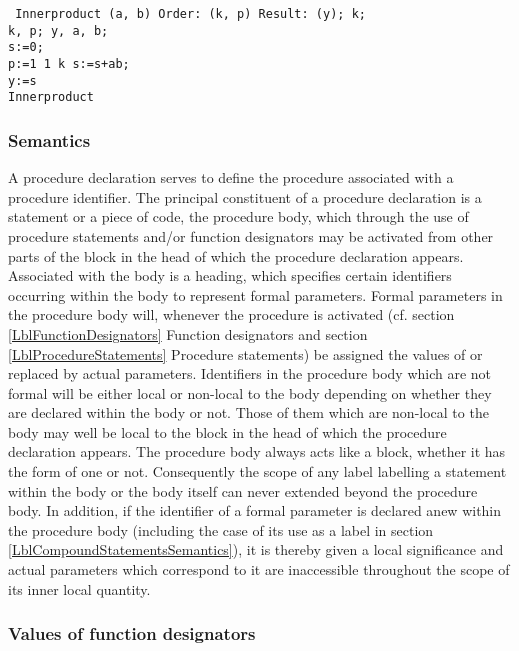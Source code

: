 \documentclass[a4paper,11pt]{article}
\begin{document}
\begin{flushleft}
\texttt{ Innerproduct (a, b) Order: (k, p) Result: (y);  k;\\
 k, p;  y, a, b;\\
s:=0;\\
 p:=1  1  k  s:=s+a\mtim{}b;\\
y:=s\\
 Innerproduct
}\end{flushleft}


\subsubsection{Semantics}
\label{LblProcedureDeclarationsSemantics}

A procedure declaration serves to define the procedure associated with
a procedure identifier.  The principal constituent of a procedure
declaration is a statement or a piece of code, the procedure body,
which through the use of procedure statements and/or function
designators may be activated from other parts of the block in the head
of which the procedure declaration appears.  Associated with the body
is a heading, which specifies certain identifiers occurring within the
body to represent formal parameters.  Formal parameters in the
procedure body will, whenever the procedure is activated (cf. section
\ref{LblFunctionDesignators} Function designators and section
\ref{LblProcedureStatements} Procedure statements) be assigned the
values of or replaced by actual parameters.  Identifiers in the
procedure body which are not formal will be either local or non-local
to the body depending on whether they are declared within the body or
not.  Those of them which are non-local to the body may well be local
to the block in the head of which the procedure declaration appears.
The procedure body always acts like a block, whether it has the form
of one or not.  Consequently the scope of any label labelling a
statement within the body or the body itself can never extended beyond
the procedure body.  In addition, if the identifier of a formal
parameter is declared anew within the procedure body (including the
case of its use as a label in section
\ref{LblCompoundStatementsSemantics}), it is thereby given a local
significance and actual parameters which correspond to it are
inaccessible throughout the scope of its inner local quantity.

\subsubsection{Values of function designators}
\label{LblValuesOfFuncDesignators}
\end{document}
